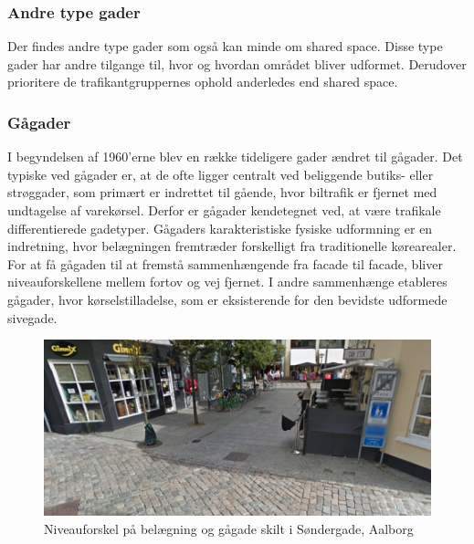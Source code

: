 \subsubsection{Andre type gader}
\label{subs:andre_type_gader}

Der findes andre type gader som også kan minde om shared space. Disse type gader har andre tilgange til, hvor og hvordan området bliver udformet. Derudover prioritere de trafikantgruppernes ophold anderledes end shared space.

\subsubsection{Gågader}
\label{subs:gaagader}

I begyndelsen af 1960’erne blev en række tideligere gader ændret til gågader. Det typiske ved gågader er, at de ofte ligger centralt ved beliggende butiks- eller strøggader, som primært er indrettet til gående, hvor biltrafik er fjernet med undtagelse af varekørsel. Derfor er gågader kendetegnet ved, at være trafikale differentierede gadetyper.
Gågaders karakteristiske fysiske udformning er en indretning, hvor belægningen fremtræder forskelligt fra traditionelle kørearealer. For at få gågaden til at fremstå sammenhængende fra facade til facade, bliver niveauforskellene mellem fortov og vej fjernet. I andre sammenhænge etableres gågader, hvor kørselstilladelse, som er eksisterende for den bevidste udformede sivegade. \autocite{vejlednigomss2013} %
\begin{figure}[htbp]
  \centering
  \begin{adjustbox}{max width=\textwidth}
    \includegraphics{figures/Billederogfigur/Indledningen/gaagade_ved_slotsgade.png}
 \end{adjustbox}
  \caption{Niveauforskel på belægning og gågade skilt i Søndergade, Aalborg \autocite{gm2015}}
    \label{fig:nivbelaegningegaagade}
\end{figure}

